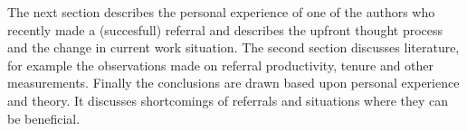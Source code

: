 \documentclass[main.tex]{subfiles}
\begin{document}
The next section describes the personal experience of one of the authors who recently made a (succesfull) referral and describes the upfront thought process and the change in current work situation. The second section discusses literature, for example the observations made on referral productivity, tenure and other measurements. Finally the conclusions are drawn based upon personal experience and theory. It discusses shortcomings of referrals and situations where they can be beneficial.
\end{document}
